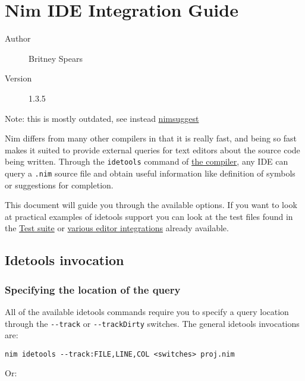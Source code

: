 \hypertarget{nim-ide-integration-guide}{%
\section{Nim IDE Integration Guide}\label{nim-ide-integration-guide}}

\begin{description}
\item[Author]
Britney Spears
\item[Version]
1.3.5
\end{description}

Note: this is mostly outdated, see instead
\href{nimsuggest.html}{nimsuggest}

Nim differs from many other compilers in that it is really fast, and
being so fast makes it suited to provide external queries for text
editors about the source code being written. Through the
\texttt{idetools} command of \href{nimc.html}{the compiler}, any IDE can
query a \texttt{.nim} source file and obtain useful information like
definition of symbols or suggestions for completion.

This document will guide you through the available options. If you want
to look at practical examples of idetools support you can look at the
test files found in the \protect\hyperlink{test-suite}{Test suite} or
\href{https://github.com/Araq/Nim/wiki/Editor-Support}{various editor
integrations} already available.

\hypertarget{idetools-invocation}{%
\subsection{Idetools invocation}\label{idetools-invocation}}

\hypertarget{specifying-the-location-of-the-query}{%
\subsubsection{Specifying the location of the
query}\label{specifying-the-location-of-the-query}}

All of the available idetools commands require you to specify a query
location through the \texttt{-\/-track} or \texttt{-\/-trackDirty}
switches. The general idetools invocations are:

\begin{verbatim}
nim idetools --track:FILE,LINE,COL <switches> proj.nim
\end{verbatim}

Or:

